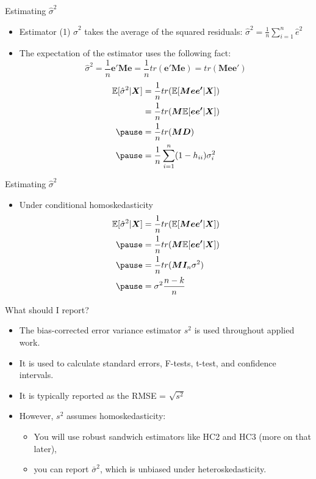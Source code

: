 \documentclass[aspectratio=169, handout]{beamer}
\numberwithin{equation}{section}
\begin{document}
\begin{frame}{Estimating $\hat{\sigma}^2$}
\begin{itemize}
\item Estimator (1) $\hat{\sigma}^2$ takes the average of the squared residuals: $\hat{\sigma}^2=\frac{1}{n}\sum_{i=1}^n \hat{e}^2$

\item The expectation of the estimator uses the following fact:
$$\hat{\sigma}^2=\frac{1}{n}\bm{e'}\bm{M}\bm{e}=\frac{1}{n}tr(\bm{e'}\bm{M}\bm{e})=tr(\bm{Mee'})$$
\begin{align*}
\mathbb{E}[\hat{\sigma}^2|\bm{X}]&=\frac{1}{n}tr(\mathbb{E}[\bm{Mee'}|\bm{X}])\\
&=\frac{1}{n}tr(\bm{M}\mathbb{E}[\bm{ee'}|\bm{X}])\\ \pause
&=\frac{1}{n}tr(\bm{M}\bm{D})\\\pause
&=\frac{1}{n}\sum_{i=1}^n(1-h_{ii})\sigma^2_i
\end{align*}
\end{itemize}
\end{frame}  

\begin{frame}{Estimating $\hat{\sigma}^2$}
\begin{itemize}
\item Under conditional homoskedasticity
\begin{align*}
\mathbb{E}[\hat{\sigma}^2|\bm{X}]&=\frac{1}{n}tr(\mathbb{E}[\bm{Mee'}|\bm{X}])\\\pause
&=\frac{1}{n}tr(\bm{M}\mathbb{E}[\bm{ee'}|\bm{X}])\\\pause
&=\frac{1}{n}tr(\bm{M}\bm{I}_n\sigma^2)\\\pause
&=\sigma^2\frac{n-k}{n}
\end{align*}
\end{itemize}
\end{frame}
 
\begin{frame}{What should I report?}
\begin{itemize}
\item The bias-corrected error variance estimator $s^2$ is used throughout applied work.
\item It is used to calculate standard errors, F-tests, t-test, and confidence intervals.
\item It is typically reported as the RMSE = $\sqrt{s^2}$
\item However, $s^2$ assumes homoskedasticity:
\begin{itemize}
\item You will use robust sandwich estimators like HC2 and HC3 (more on that later),
\item you can report $\bar{\sigma}^2$, which is unbiased under heteroskedasticity.
\end{itemize}
\end{itemize}
\end{frame}
 
 
\end{document}
